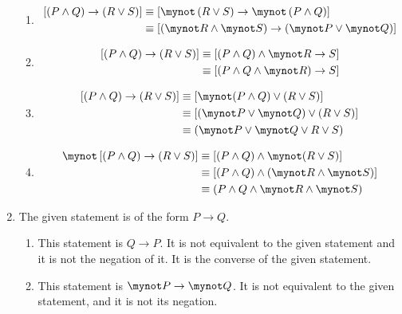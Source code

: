 \begin{enumerate}
\begin{enumerate}
\item \begin{align*}
\left[ \left( P \wedge Q \right) \to \left( R \vee S \right) \right] &\equiv 
\left[ \mynot \left( R \vee S \right) \to \mynot \left( P \wedge Q \right) \right] \\
&\equiv \left[ \left( \mynot R \wedge \mynot S \right) \to \left( \mynot P \vee \mynot Q \right) \right] \\
\end{align*}

\item \begin{align*}
\left[ \left( P \wedge Q \right) \to \left( R \vee S \right) \right] &\equiv 
\left[ \left( P \wedge Q \right) \wedge \mynot R  \to S \right] \\
&\equiv \left[ \left( P \wedge Q \wedge \mynot R \right) \to S \right]
\end{align*}

\item \begin{align*}
\left[ \left( P \wedge Q \right) \to \left( R \vee S \right) \right] &\equiv 
[\mynot(P \wedge Q) \vee (R \vee S)] \\
&\equiv [(\mynot P \vee \mynot Q) \vee (R \vee S)] \\
&\equiv (\mynot P \vee \mynot Q \vee R \vee S)
\end{align*}

\item \begin{align*}
\mynot \left[ \left( P \wedge Q \right) \to \left( R \vee S \right) \right] &\equiv 
[(P \wedge Q) \wedge \mynot (R \vee S)] \\
&\equiv [(P \wedge Q) \wedge (\mynot R \wedge \mynot S)] \\
&\equiv (P \wedge Q \wedge \mynot R \wedge \mynot S)
\end{align*}

\end{enumerate}


\item The given statement is of the form $P \to Q$.
\begin{enumerate}
\item This statement is $Q \to P$.  It is not equivalent to the given statement and it is not the negation of it.  It is the converse of the given statement.

\item This statement is $\mynot P \to \mynot Q$.  It is not equivalent to the given statement, and it is not its negation.


\end{enumerate}
\end{enumerate}
